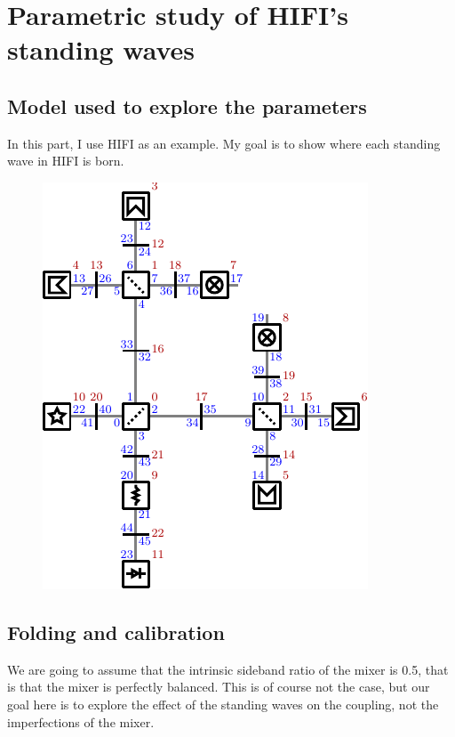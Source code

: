 \cleardoublepage
\chapter{Parametric study of HIFI's standing waves}

\section{Model used to explore the parameters}
In this part, I use HIFI as an example.
My goal is to show where each standing wave in HIFI is born.

\begin{figure}[hbtp]
    \centering
    \includegraphics{ports_diplexerband}
    \label{fig:ports_diplexerband}
\end{figure}



\section{Folding and calibration}

We are going to assume that the intrinsic sideband ratio of the mixer is 0.5, that is that the mixer is perfectly balanced.  This is of course not the case, but our goal here is to explore the effect of the standing waves on the coupling, not the imperfections of the mixer.

